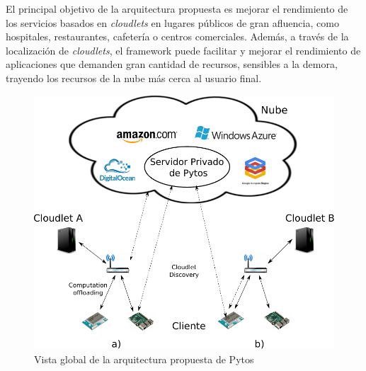 


El principal objetivo de la arquitectura propuesta es mejorar el rendimiento de los servicios basados en \textit{cloudlets} en lugares públicos 
de gran afluencia, como hospitales, restaurantes, cafetería o centros comerciales. Además, a través de la localización de \textit{cloudlets}, el 
framework puede facilitar y mejorar el rendimiento de aplicaciones que demanden gran cantidad de recursos, sensibles a la demora, trayendo los
recursos de la nube más cerca al usuario final.

\begin{figure}
\centering
 \includegraphics[scale=0.72]{Figures/generalArchitecture.pdf}
 \caption{Vista global de la arquitectura propuesta de Pytos}
 \label{fig:pytosOverview}
\end{figure}

